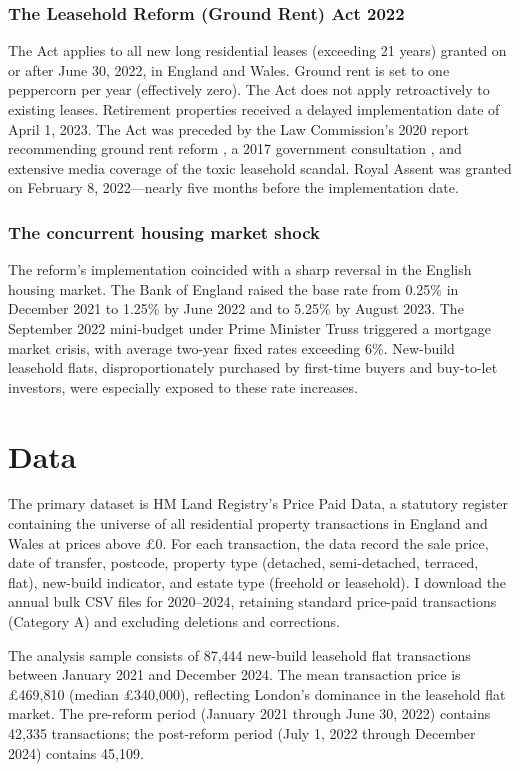 \documentclass[12pt]{article}
\begin{document}
\subsubsection*{The Leasehold Reform (Ground Rent) Act 2022} The Act applies to all new long residential leases (exceeding 21 years) granted on or after June 30, 2022, in England and Wales. Ground rent is set to one peppercorn per year (effectively zero). The Act does not apply retroactively to existing leases. Retirement properties received a delayed implementation date of April 1, 2023. The Act was preceded by the Law Commission's 2020 report recommending ground rent reform \citep{law_commission_2020}, a 2017 government consultation \citep{mhclg2017}, and extensive media coverage of the toxic leasehold scandal. Royal Assent was granted on February 8, 2022---nearly five months before the implementation date.

\subsubsection*{The concurrent housing market shock} The reform's implementation coincided with a sharp reversal in the English housing market. The Bank of England raised the base rate from 0.25\% in December 2021 to 1.25\% by June 2022 and to 5.25\% by August 2023. The September 2022 mini-budget under Prime Minister Truss triggered a mortgage market crisis, with average two-year fixed rates exceeding 6\%. New-build leasehold flats, disproportionately purchased by first-time buyers and buy-to-let investors, were especially exposed to these rate increases.

\section{Data}

The primary dataset is HM Land Registry's Price Paid Data, a statutory register containing the universe of all residential property transactions in England and Wales at prices above \pounds 0. For each transaction, the data record the sale price, date of transfer, postcode, property type (detached, semi-detached, terraced, flat), new-build indicator, and estate type (freehold or leasehold). I download the annual bulk CSV files for 2020--2024, retaining standard price-paid transactions (Category A) and excluding deletions and corrections.

The analysis sample consists of 87,444 new-build leasehold flat transactions between January 2021 and December 2024. The mean transaction price is \pounds 469,810 (median \pounds 340,000), reflecting London's dominance in the leasehold flat market. The pre-reform period (January 2021 through June 30, 2022) contains 42,335 transactions; the post-reform period (July 1, 2022 through December 2024) contains 45,109.
\end{document}
